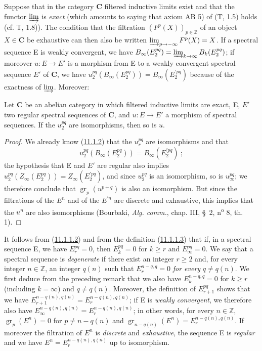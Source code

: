 \begin{env}[11.1.4]
\label{0.11.1.4}
Suppose that in the category $\boldsymbol{C}$ filtered inductive limits
exist and that the functor $\varinjlim$ is \emph{exact} (which amounts to
saying that axiom AB 5) of (T, 1.5) holds (cf. T, 1.8)). The condition
that the filtration $(F^p(X))_{p\in\mathbb Z}$ of an object $X\in\boldsymbol{C}$ be
exhaustive can then also be written
$\varinjlim_{p\to-\infty}F^p(X)=X$. If a spectral sequence E is weakly
convergent, we have
$B_\infty(E_2^{pq})=\varinjlim_{k\to\infty}B_k(E_2^{pq})$; if moreover
$u:E\to E'$ is a morphism from E to a weakly convergent spectral sequence $E'$ of
$\boldsymbol{C}$, we have
$u_2^{pq}(B_\infty(E_2^{pq}))=B_\infty(E_2^{\prime pq})$ because of
the exactness of $\varinjlim$. Moreover:
\end{env}

\begin{proposition}[11.1.5]
\label{0.11.1.5}
Let $\mathbf{C}$ be an abelian category in which filtered inductive limits
are exact, \textup{E}, $E'$ two regular spectral sequences
of $\mathbf{C}$, and $u:E\to E'$ a morphism of spectral sequences. If the
$u_2^{pq}$ are isomorphisms, then so is $u$.
\end{proposition}

\begin{proof}
We already know (\hyperref[0.11.1.2]{11.1.2}) that the $u_r^{pq}$ are
isomorphisms and that
\[
  u_2^{pq}(B_\infty(E_2^{pq}))=B_\infty(E_2^{\prime pq})~;
\]
the hypothesis that E and $E'$ are regular also implies
$u_2^{pq}(Z_\infty(E_2^{pq}))=Z_\infty(E_2^{\prime pq})$, and since
$u_2^{pq}$ is an isomorphism, so is $u_\infty^{pq}$; we therefore
conclude that $\operatorname{gr}_p(u^{p+q})$ is also an isomorphism.
But since the filtrations of the $E^n$ and of the $E^{\prime n}$ are discrete and
exhaustive, this implies that the $u^n$ are also isomorphisms
(Bourbaki, \emph{Alg. comm.}, chap. III, \S~2, n\textsuperscript{o} 8,
th. 1).
\end{proof}

\begin{env}[11.1.6]
\label{0.11.1.6}
It follows from (\hyperref[0.11.1.1.2]{11.1.1.2}) and from the definition
(\hyperref[0.11.1.1.3]{11.1.1.3}) that if, in a spectral sequence E, we have
$E_r^{pq}=0$, then $E_k^{pq}=0$ for $k\geq r$ and $E_\infty^{pq}=0$. We say
that a spectral sequence is \emph{degenerate} if there exist an integer $r\geq2$ and,
for every integer $n\in\mathbb Z$, an integer $q(n)$ such that
$E_r^{n-q,q}=0$ \emph{for every} $q\ne q(n)$. We first deduce from the preceding
remark that we also have $E_k^{n-q,q}=0$ for $k\geq r$ (including
$k=\infty$) and $q\ne q(n)$. Moreover, the definition of $E_{r+1}^{pq}$ shows
that we have
$E_{r+1}^{n-q(n),q(n)}=E_r^{n-q(n),q(n)}$; if E is \emph{weakly convergent},
we therefore also have
$E_\infty^{n-q(n),q(n)}=E_r^{n-q(n),q(n)}$; in other words, for every
$n\in\mathbb Z$, $\operatorname{gr}_p(E^n)=0$ for $p\ne n-q(n)$ and
$\operatorname{gr}_{n-q(n)}(E^n)=E_r^{n-q(n),q(n)}$. If moreover the filtration
of $E^n$ is \emph{discrete} and \emph{exhaustive}, the sequence E is \emph{regular} and we have
$E^n=E_r^{n-q(n),q(n)}$ up to isomorphism.
\end{env}

